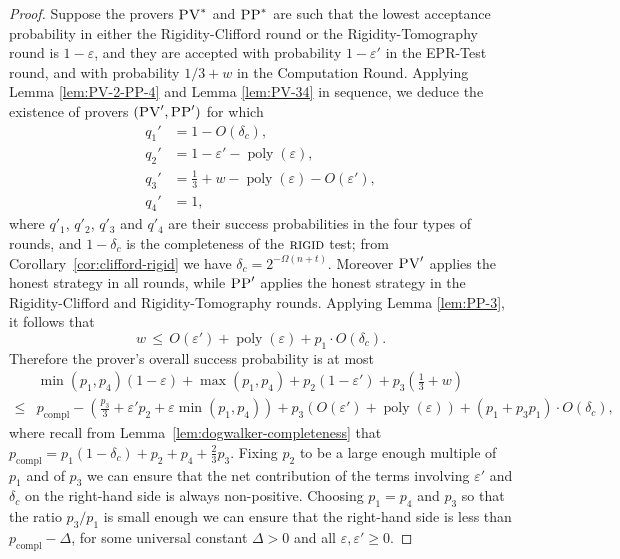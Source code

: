 \documentclass[11pt,letter]{article}
\theoremstyle{remark}
\theoremstyle{definition}
\DeclareMathOperator{\poly}{poly}
\newcommand{\eps}{\varepsilon}
\newcommand{\rigid}{\textsc{rigid}}
\newcommand{\pv}{\textsc{PV}}
\newcommand{\pp}{\textsc{PP}}
\begin{document}
\begin{proof}

Suppose the provers $\pv^*$ and $\pp^*$ are such that the lowest acceptance probability in either the Rigidity-Clifford round or the Rigidity-Tomography round is $1- \eps$, and they are accepted with probability $1-\eps'$ in the EPR-Test round, and with probability $1/3+w$ in the Computation Round. Applying  Lemma \ref{lem:PV-2-PP-4} and Lemma \ref{lem:PV-34} in sequence, we deduce the existence of provers $(\pv',\pp')$ for which
\begin{align*}
q_1' &= 1- O(\delta_c), \\  q_2' &= 1-\eps'- \poly(\eps), \\ q_3' &= \frac13+w-
  \poly(\eps)-O(\eps'),\\ q_4' &= 1,
\end{align*}
where $q'_1$, $q'_2$, $q'_3$ and $q'_4$ are their success probabilities in the
  four types of rounds, and $1-\delta_c$ is the completeness of the
  $\rigid$ test; from Corollary~\ref{cor:clifford-rigid} we have $\delta_c = 2^{-\Omega(n+t)}$. Moreover $\pv'$ applies the honest strategy in all rounds, while $\pp'$ applies the honest strategy in the Rigidity-Clifford and Rigidity-Tomography rounds. Applying Lemma \ref{lem:PP-3}, it follows that 
$$w \,\leq\, O(\eps') + \poly(\eps) +p_1 \cdot O(\delta_c).$$
Therefore the prover's overall success probability is at most 
\begin{align*}
& \min(p_1,p_4)(1-\eps)+\max(p_1,p_4) + p_2(1-\eps')+p_3\left(\frac{1}{3}+w\right) \\
\leq & p_{\mathrm{compl}} - \left( \frac{p_3}{3} + \eps' p_2+\eps\min(p_1,p_4)\right)+ p_3\left(O(\eps')+\poly(\eps)\right)+ (p_1 + p_3p_1) \cdot O(\delta_c),
\end{align*}
where recall from Lemma~\ref{lem:dogwalker-completeness} that
  $p_{\mathrm{compl}} =  p_1(1-\delta_c)+p_2+p_4+\frac{2}{3}p_3$. Fixing $p_2$
  to be a large enough multiple of $p_1$ and of $p_3$ we can ensure that the net contribution
  of the terms involving $\eps'$ and $\delta_c$ on the right-hand side is always
  non-positive. Choosing $p_1=p_4$ and $p_3$ so that the ratio $p_3/p_1$ is small
  enough we can ensure that the right-hand side is less than $p_{\mathrm{compl}}
  -\Delta$, for some universal constant $\Delta>0$ and all $\eps,\eps'\geq 0$.
  



\end{proof}
\end{document}
